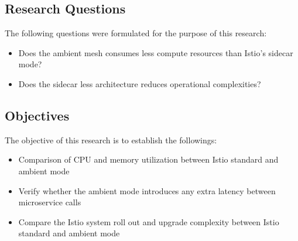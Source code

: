 \subsection{Research Questions}
The following questions were formulated for the purpose of this research:
\begin{itemize}
\item Does the ambient mesh consumes less compute resources than Istio's sidecar mode?
\item Does the sidecar less architecture reduces operational complexities?
\end{itemize}

\subsection{Objectives}
The objective of this research is to establish the followings:
\begin{itemize}
\item Comparison of CPU and memory utilization between Istio standard and ambient mode
\item Verify whether the ambient mode introduces any extra latency between microservice calls
\item Compare the Istio system roll out and upgrade complexity between Istio standard and ambient mode
\end{itemize}